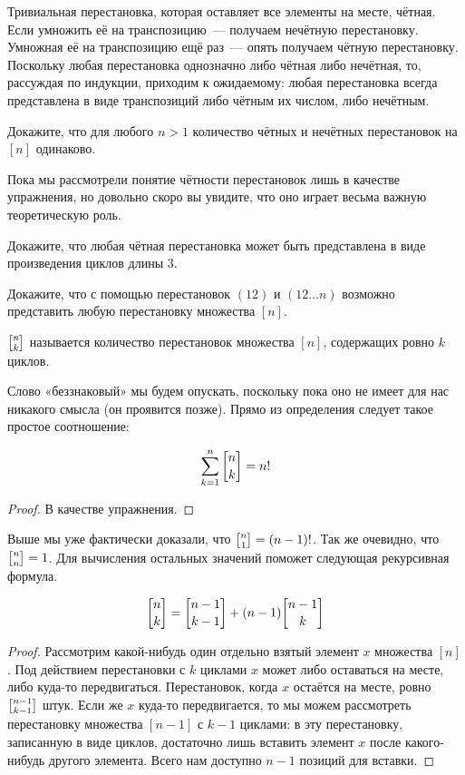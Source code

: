 Тривиальная перестановка, которая оставляет все элементы на месте, чётная. Если умножить её на транспозицию~— получаем нечётную перестановку. Умножная её на транспозицию ещё раз~— опять получаем чётную перестановку. Поскольку любая перестановка однозначно либо чётная либо нечётная, то, рассуждая по индукции, приходим к ожидаемому: любая перестановка всегда представлена в виде транспозиций либо чётным их числом, либо нечётным.

\begin{exercise}\label{ex:sgnpermgrp}
Докажите, что для любого $n>1$ количество чётных и нечётных перестановок на $[n]$ одинаково.
\end{exercise}

Пока мы рассмотрели понятие чётности перестановок лишь в качестве упражнения, но довольно скоро вы увидите, что оно играет весьма важную теоретическую роль.

\begin{exercise}
Докажите, что любая чётная перестановка может быть представлена в виде произведения циклов длины 3.
\end{exercise}

\begin{exercise}
Докажите, что с помощью перестановок $(12)$ и $(12\ldots n)$ возможно представить любую перестановку множества $[n]$.
\end{exercise}

\begin{definition}
 $\fstirling{n}{k}$ называется количество перестановок множества $[n]$, содержащих ровно $k$ циклов.
\end{definition}

Слово «беззнаковый» мы будем опускать, поскольку пока оно не имеет для нас никакого смысла (он проявится позже). Прямо из определения следует такое простое соотношение:

\begin{thm}
$$\sum_{k=1}^n \fstirling{n}{k} = n!$$
\end{thm}
\begin{proof}
В качестве упражнения.
\end{proof}

Выше мы уже фактически доказали, что $\fstirling{n}{1} = (n-1)!$. Так же очевидно, что $\fstirling{n}{n} = 1$. Для вычисления остальных значений поможет следующая рекурсивная формула.

\begin{thm}
$$\fstirling{n}{k} = \fstirling{n-1}{k-1} + (n-1)\fstirling{n-1}{k}$$
\end{thm}
\begin{proof}
Рассмотрим какой-нибудь один отдельно взятый элемент $x$ множества $[n]$. Под действием перестановки с $k$ циклами $x$ может либо оставаться на месте, либо куда-то передвигаться. Перестановок, когда $x$ остаётся на месте, ровно $\fstirling{n-1}{k-1}$ штук. Если же $x$ куда-то передвигается, то мы можем рассмотреть перестановку множества $[n-1]$ с $k-1$ циклами: в эту перестановку, записанную в виде циклов, достаточно лишь вставить элемент $x$ после какого-нибудь другого элемента. Всего нам доступно $n-1$ позиций для вставки.
\end{proof}

